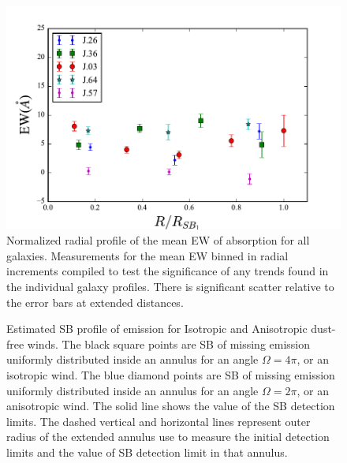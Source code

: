 \documentclass[twocolumn]{aastex61}
\begin{document}
\begin{figure}[!htb]
\centering
\includegraphics[scale=0.9]{../Figures/ew_comb.pdf}
\caption{Normalized radial profile of the mean EW of  absorption for all galaxies. Measurements for the mean EW binned in radial increments compiled to test the significance of any trends found in the individual galaxy profiles. There is significant scatter relative to the error bars at extended distances.}
\label{fig:ew_comb}
\end{figure}


 
\begin{figure}[h]
\centering
{}
\caption{Estimated SB profile of  emission for Isotropic and Anisotropic dust-free winds. The black square points are SB of missing  emission uniformly distributed inside an annulus for an angle $\Omega=4\pi$, or an isotropic wind. The blue diamond points are SB of missing  emission uniformly distributed inside an annulus for an angle $\Omega=2\pi$, or an anisotropic wind. The solid line shows the value of the SB detection limits. The dashed vertical and horizontal lines represent outer radius of the extended annulus use to measure the initial detection limits and the value of SB detection limit in that annulus.}
\label{fig.emission}
\end{figure}

\newpage

\end{document}
